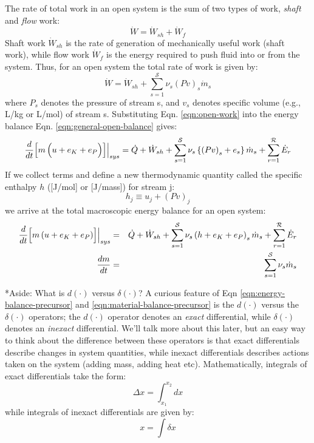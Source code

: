 \documentclass[11pt]{article}
\makeatletter
\theoremstyle{definition}
\renewcommand\paragraph{\@startsection
	{paragraph}{2}{0mm}
	{-0.05in}
	{-0.5\baselineskip}
	{\normalfont\normalsize\itshape}}
\makeatother
\begin{document}
The rate of total work in an open system is the sum of two types of work, \emph{shaft} and \emph{flow} work:
\begin{equation}
	\dot{W} = \dot{W}_{sh} + \dot{W}_{f}
\end{equation}
Shaft work $\dot{W}_{sh}$ is the rate of generation of mechanically useful work (shaft work), while flow work $\dot{W}_{f}$ is the energy required to push fluid into or from the system.
Thus, for an open system the total rate of work is given by:
\begin{equation}\label{eqn:open-work}
	\dot{W} = \dot{W}_{sh} + \sum_{s=1}^{\mathcal{S}}\nu_{s}\left(Pv\right)_{s}\dot{m}_{s}
\end{equation}where $P_{s}$ denotes the pressure of stream s, and $v_{s}$ denotes specific volume (e.g., L/kg or L/mol) of stream s.
Substituting Eqn. \eqref{eqn:open-work} into the energy balance Eqn. \eqref{eqn:general-open-balance} gives:
\begin{equation}
	\frac{d}{dt}\Bigl[m\left(u+e_{K}+e_{P}\Bigl)\right]\Bigr|_{sys} = \dot{Q}+\dot{W}_{sh} + \sum_{s=1}^{\mathcal{S}}\nu_{s}\left\{\left(Pv\right)_{s}+e_{s}\right\}\dot{m}_{s}+ \sum_{r=1}^{\mathcal{R}}\dot{E}_{r}
\end{equation}If we collect terms and define a new thermodynamic quantity called the specific enthalpy $h$ ([J/mol] or [J/mass]) for stream j:
\begin{equation}
	h_{j} \equiv u_{j} + \left(Pv\right)_{j}
\end{equation}we arrive at the total macroscopic energy balance for an open system:
\begin{eqnarray}
	\frac{d}{dt}\Bigl[m\left(u+e_{K}+e_{P}\right)\Bigr]\Bigr|_{sys} &=& \dot{Q}+\dot{W}_{sh} + \sum_{s=1}^{\mathcal{S}}\nu_{s}\left(h+e_{K}+e_{P}\right)_{s}\dot{m}_{s} + \sum_{r=1}^{\mathcal{R}}\dot{E}_{r}\\
	\frac{dm}{dt} &=& \sum_{s=1}^{\mathcal{S}}\nu_{s}\dot{m}_{s}
\end{eqnarray}

\paragraph*{Aside: What is $d\left(\cdot\right)$ versus $\delta\left(\cdot\right)$?}
A curious feature of Eqn \eqref{eqn:energy-balance-precursor} and \eqref{eqn:material-balance-precursor} is the $d\left(\cdot\right)$ versus the $\delta\left(\cdot\right)$ operators;
the $d\left(\cdot\right)$ operator denotes an \textit{exact} differential, while $\delta\left(\cdot\right)$ denotes an \textit{inexact} differential.
We'll talk more about this later, but an easy way to think about the difference between these operators is that exact differentials describe changes in system quantities,
while inexact differentials describes actions taken on the system (adding mass, adding heat etc).
Mathematically, integrals of exact differentials take the form:
\begin{equation}
\Delta x = \int_{x_{1}}^{x_{2}}dx
\end{equation}while integrals of inexact differentials are given by:
\begin{equation}
x = \int \delta x
\end{equation}
\end{document}
